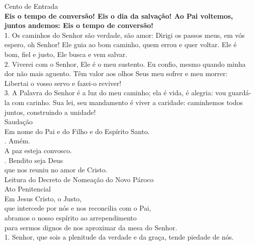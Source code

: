 \documentclass{book}
\begin{document}
\begin{flushleft}
    \textcolor{VioletRed2}{Cento de Entrada}
    \vspace{.2cm} \\
    \textbf{Eis o tempo de conversão! Eis o dia da salvação! Ao Pai voltemos, juntos andemos: Eis o tempo de conversão!}
    \vspace{.2cm} \\
    1. Os caminhos do Senhor são verdade, são amor: Dirigi os passos meus, em vós espero, oh Senhor! Ele guia ao bom caminho, quem errou e quer voltar. Ele é bom, fiel e justo, Ele busca e vem salvar. \\
    2. Viverei com o Senhor, Ele é o meu sustento. Eu confio, mesmo quando minha dor não mais aguento. Têm valor aos olhos Seus meu sofrer e meu morrer: Libertai o vosso servo e fazei-o reviver! \\
    3. A Palavra do Senhor é a luz do meu caminho; ela é vida, é alegria: vou guardá-la com carinho. Sua lei, seu mandamento é viver a caridade: caminhemos todos juntos, construindo a unidade!
    \vspace{.2cm} \\
    \textcolor{VioletRed2}{Saudação}
    \vspace{.2cm}\\
    Em nome do Pai e do Filho e do Espírito Santo. \\
    {\color{VioletRed2} \Rbar.} Amém. \\
    A paz esteja convosco. \\
    {\color{VioletRed2} \Rbar.} Bendito seja Deus \\
    que nos reuniu no amor de Cristo.
    \vspace{.2cm} \\
    \textcolor{VioletRed2}{Leitura do Decreto de Nomeação do Novo Pároco}
    \vspace{.2cm} \\
    \textcolor{VioletRed2}{Ato Penitencial}
    \vspace{.2cm} \\
    Em Jesus Cristo, o Justo, \\
    que intercede por nós e nos reconcilia com o Pai, \\
    abramos o nosso espírito ao arrependimento \\
    para sermos dignos de nos aproximar da mesa do Senhor.
    \vspace{.2cm} \\
    1. Senhor, que sois a plenitude da verdade e da graça, tende piedade de nós.

\end{flushleft}
\end{document}
